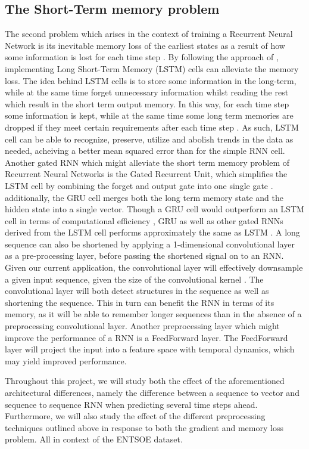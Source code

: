 \documentclass
[twocolumn,
secnumarabic,
nobibnotes,
aps,
prl,
reprint,
groupedaddress,
amsmath,
amssymb,
]{revtex4-2}
\begin{document}
\subsection{The Short-Term memory problem}
The second problem which arises in the context of training a Recurrent Neural Network is its inevitable memory loss of the earliest states as a result of how some information is lost for each time step \cite{Geron2019}. By following the approach of \cite{Hochreiter1997}, implementing Long Short-Term Memory (LSTM) cells can alleviate the memory loss. The idea behind LSTM cells is to store some information in the long-term, while at the same time forget unnecessary information whilst reading the rest which result in the short term output memory. In this way, for each time step some information is kept, while at the same time some long term memories are dropped if they meet certain requirements after each time step \cite{Geron2019}. As such, LSTM cell can be able to recognize, preserve, utilize and abolish trends in the data as needed, acheiving a better mean squared error than for the simple RNN cell. 
Another gated RNN which might alleviate the short term memory problem of Recurrent Neural Networks is the Gated Recurrent Unit, which simplifies the LSTM cell by combining the forget and output gate into one single gate \cite{Goodfellow2016}. additionally, the GRU cell merges both the long term memory state and the hidden state into a single vector. Though a GRU cell would outperform an LSTM cell in terms of computational efficiency \cite{Geron2019}, GRU as well as other gated RNNs derived from the LSTM cell performs approximately the same as LSTM \cite{Greff2015}.
A long sequence can also be shortened by applying a 1-dimensional convolutional layer as a pre-processing layer, before passing the shortened signal on to an RNN. Given our current application, the convolutional layer will effectively downsample a given input sequence, given the size of the convolutional kernel \cite{Geron2019}. The convolutional layer will both detect structures in the sequence as well as shortening the sequence. This in turn can benefit the RNN in terms of its memory, as it will be able to remember longer sequences than in the absence of a preprocessing convolutional layer.
Another preprocessing layer which might improve the performance of a RNN is a FeedForward layer. The FeedForward layer will project the input into a feature space with temporal dynamics, which may yield improved performance. \cite{Murugan2018}

Throughout this project, we will study both the effect of the aforementioned architectural differences, namely the difference between a sequence to vector and sequence to sequence RNN when predicting several time steps ahead. Furthermore, we will also study the effect of the different preprocessing techniques outlined above in response to both the gradient and memory loss problem. All in context of the ENTSOE dataset. 
\end{document}
